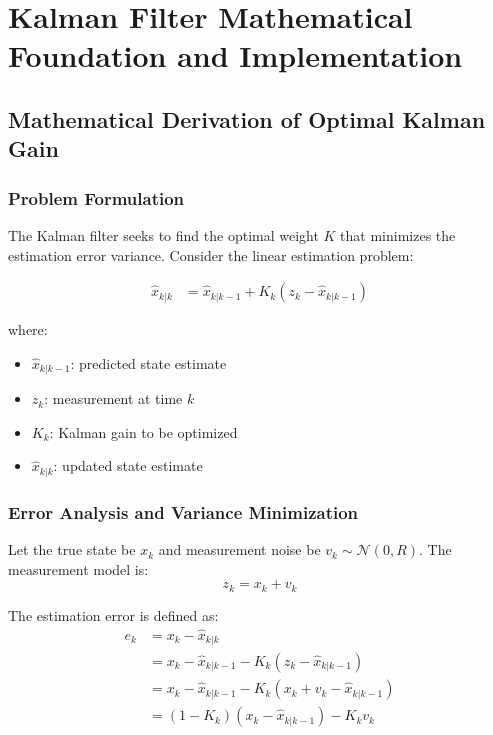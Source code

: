 \documentclass{article}
\begin{document}
\section{Kalman Filter Mathematical Foundation and Implementation}

\subsection{Mathematical Derivation of Optimal Kalman Gain}

\subsubsection{Problem Formulation}

The Kalman filter seeks to find the optimal weight $K$ that minimizes the estimation error variance. Consider the linear estimation problem:

\begin{align}
\hat{x}_{k|k} &= \hat{x}_{k|k-1} + K_k(z_k - \hat{x}_{k|k-1}) \label{eq:state_update}
\end{align}

where:
\begin{itemize}
    \item $\hat{x}_{k|k-1}$: predicted state estimate
    \item $z_k$: measurement at time $k$
    \item $K_k$: Kalman gain to be optimized
    \item $\hat{x}_{k|k}$: updated state estimate
\end{itemize}

\subsubsection{Error Analysis and Variance Minimization}

Let the true state be $x_k$ and measurement noise be $v_k \sim \mathcal{N}(0, R)$. The measurement model is:
\begin{equation}
z_k = x_k + v_k \label{eq:measurement_model}
\end{equation}

The estimation error is defined as:
\begin{align}
e_k &= x_k - \hat{x}_{k|k} \\
&= x_k - \hat{x}_{k|k-1} - K_k(z_k - \hat{x}_{k|k-1}) \\
&= x_k - \hat{x}_{k|k-1} - K_k(x_k + v_k - \hat{x}_{k|k-1}) \\
&= (1-K_k)(x_k - \hat{x}_{k|k-1}) - K_k v_k \label{eq:error_decomposition}
\end{align}
\end{document}
